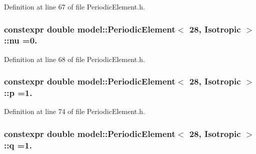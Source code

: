 Definition at line 67 of file Periodic\+Element.\+h.

\hypertarget{structmodel_1_1_periodic_element_3_0128_00_01_isotropic_01_4_ad8e88bbd40a04c819c18d7a0463f3981}{}
\subsubsection[{nu}]{\setlength{\rightskip}{0pt plus 5cm}constexpr double {\bf model\+::\+Periodic\+Element}$<$ 28, {\bf Isotropic} $>$\+::nu =0.\hspace{0.3cm}{\ttfamily [static]}}\label{structmodel_1_1_periodic_element_3_0128_00_01_isotropic_01_4_ad8e88bbd40a04c819c18d7a0463f3981}


Definition at line 68 of file Periodic\+Element.\+h.

\hypertarget{structmodel_1_1_periodic_element_3_0128_00_01_isotropic_01_4_a0f8924da09ce822c66238e3fefb57297}{}
\subsubsection[{p}]{\setlength{\rightskip}{0pt plus 5cm}constexpr double {\bf model\+::\+Periodic\+Element}$<$ 28, {\bf Isotropic} $>$\+::p =1.\hspace{0.3cm}{\ttfamily [static]}}\label{structmodel_1_1_periodic_element_3_0128_00_01_isotropic_01_4_a0f8924da09ce822c66238e3fefb57297}


Definition at line 74 of file Periodic\+Element.\+h.

\hypertarget{structmodel_1_1_periodic_element_3_0128_00_01_isotropic_01_4_a44287166c366722ee57e9186992d9d78}{}
\subsubsection[{q}]{\setlength{\rightskip}{0pt plus 5cm}constexpr double {\bf model\+::\+Periodic\+Element}$<$ 28, {\bf Isotropic} $>$\+::q =1.\hspace{0.3cm}{\ttfamily [static]}}\label{structmodel_1_1_periodic_element_3_0128_00_01_isotropic_01_4_a44287166c366722ee57e9186992d9d78}


